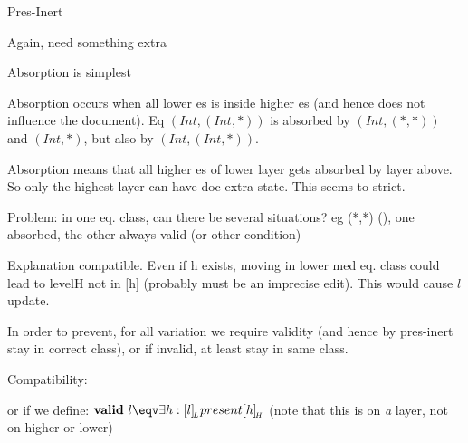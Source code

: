 







		{Pres-Inert}

Again, need something extra

Absorption is simplest



Absorption occurs when all lower es is inside higher es (and hence does not influence the document). Eq $(Int,(Int,*))$ is absorbed by  $(Int,(*,*))$ and $(Int,*)$, but also by $(Int,(Int,*))$.

Absorption means that all higher es of lower layer gets absorbed by layer above. So only the highest layer can have doc extra state. This seems to strict.

Problem: in one eq. class, can there be several situations? eg (*,*) \dbarr (), one absorbed, the other always valid (or other condition)



Explanation compatible. Even if h exists, moving in lower med eq. class could lead to levelH not in [h] (probably must be an imprecise edit). This would cause $l$ update. 

In order to prevent, for all variation we require validity (and hence by pres-inert stay in correct class), or if invalid, at least stay in same class.


Compatibility:

or if we define: ${\bf valid}~l \eqv \exists h : \eqcl{l}{L} present \eqcl{h}{H}$ (note that this is on {\em a} layer, not on higher or lower)


